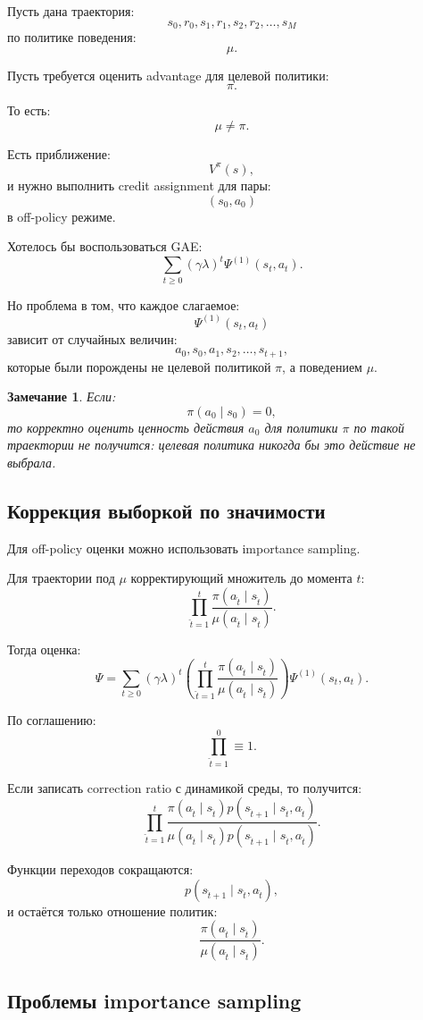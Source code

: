 \documentclass[12pt,a4paper]{article}
\newtheorem{remark}{Замечание}
\begin{document}
Пусть дана траектория:
\[
s_0,r_0,s_1,r_1,s_2,r_2,\ldots,s_M
\]
по политике поведения:
\[
\mu.
\]

Пусть требуется оценить advantage для целевой политики:
\[
\pi.
\]

То есть:
\[
\mu\ne \pi.
\]

Есть приближение:
\[
V^\pi(s),
\]
и нужно выполнить credit assignment для пары:
\[
(s_0,a_0)
\]
в off-policy режиме.

Хотелось бы воспользоваться GAE:
\[
\sum_{t\ge 0}
(\gamma\lambda)^t
\Psi^{(1)}(s_t,a_t).
\]

Но проблема в том, что каждое слагаемое:
\[
\Psi^{(1)}(s_t,a_t)
\]
зависит от случайных величин:
\[
a_0,s_0,a_1,s_2,\ldots,s_{t+1},
\]
которые были порождены не целевой политикой $\pi$, а поведением $\mu$.

\begin{remark}
Если:
\[
\pi(a_0\mid s_0)=0,
\]
то корректно оценить ценность действия $a_0$ для политики $\pi$ по такой траектории не получится: целевая политика никогда бы это действие не выбрала.
\end{remark}

\subsection{Коррекция выборкой по значимости}

Для off-policy оценки можно использовать importance sampling.

Для траектории под $\mu$ корректирующий множитель до момента $t$:
\[
\prod_{\hat t=1}^{t}
\frac{
\pi(a_{\hat t}\mid s_{\hat t})
}{
\mu(a_{\hat t}\mid s_{\hat t})
}.
\]

Тогда оценка:
\[
\Psi
=
\sum_{t\ge 0}
(\gamma\lambda)^t
\left(
\prod_{\hat t=1}^{t}
\frac{
\pi(a_{\hat t}\mid s_{\hat t})
}{
\mu(a_{\hat t}\mid s_{\hat t})
}
\right)
\Psi^{(1)}(s_t,a_t).
\]

По соглашению:
\[
\prod_{\hat t=1}^{0}
\equiv
1.
\]

Если записать correction ratio с динамикой среды, то получится:
\[
\prod_{\hat t=1}^{t}
\frac{
\pi(a_{\hat t}\mid s_{\hat t})
p(s_{\hat t+1}\mid s_{\hat t},a_{\hat t})
}{
\mu(a_{\hat t}\mid s_{\hat t})
p(s_{\hat t+1}\mid s_{\hat t},a_{\hat t})
}.
\]

Функции переходов сокращаются:
\[
p(s_{\hat t+1}\mid s_{\hat t},a_{\hat t}),
\]
и остаётся только отношение политик:
\[
\frac{
\pi(a_{\hat t}\mid s_{\hat t})
}{
\mu(a_{\hat t}\mid s_{\hat t})
}.
\]

\subsection{Проблемы importance sampling}
\end{document}
